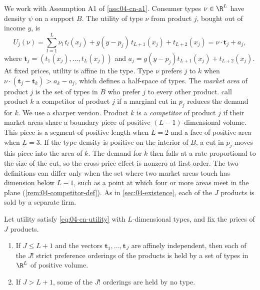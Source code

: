 We work with Assumption A1 of \cref{ass:04-cn-a1}. Consumer types $\nu \in \R^L$ have density $\psi$ on a support
$B$. The utility of type $\nu$ from product $j$, bought out of income $y$, is
\begin{equation}\label{eq:04-cn-utility}
U_j(\nu) = \sum_{l = 1}^{L}\nu_l\,t_l(x_j) + g(y - p_j)\,t_{L+1}(x_j) + t_{L+2}(x_j)
= \nu \cdot \bm{t}_j + a_j ,
\end{equation}
where $\bm{t}_j = (t_1(x_j), \dots, t_L(x_j))$ and $a_j = g(y - p_j)t_{L+1}(x_j) + t_{L+2}(x_j)$. At fixed prices,
utility is affine in the type. Type $\nu$ prefers $j$ to $k$ when $\nu \cdot (\bm{t}_j - \bm{t}_k) > a_k - a_j$, which
defines a half-space of types. The \emph{market area} of product $j$ is the set of types in $B$ who prefer $j$ to
every other product. \citet[p.~18]{CaplinNalebuff1991} call product $k$ a competitor of product $j$ if a marginal
cut in $p_j$ reduces the demand for $k$. We use a sharper version. Product $k$ is a \emph{competitor} of product
$j$ if their market areas share a boundary piece of positive $(L-1)$-dimensional volume. This piece is a segment of
positive length when $L = 2$ and a face of positive area when $L = 3$. If the type density is positive on the
interior of $B$, a cut in $p_j$ moves this piece into the area of $k$. The demand for $k$ then falls at a rate
proportional to the size of the cut, so the cross-price effect is nonzero at first order. The two definitions
can differ only when the set where two market areas touch has dimension below $L - 1$, such as a point at which
four or more areas meet in the plane (\cref{rem:04-competitor-def}). As in
\cref{sec:04-existence}, each of the $J$ products is sold by a separate firm.

\begin{proposition}\label{prop:04-cn-orderings}
Let utility satisfy \eqref{eq:04-cn-utility} with $L$-dimensional types, and fix the prices of $J$ products.
\begin{enumerate}[label=(\alph*)]
  \item If $J \leq L + 1$ and the vectors $\bm{t}_1, \dots, \bm{t}_J$ are affinely independent, then each of the $J!$
  strict preference orderings of the products is held by a set of types in $\R^L$ of positive volume.
  \item If $J > L + 1$, some of the $J!$ orderings are held by no type.
\end{enumerate}
\end{proposition}


